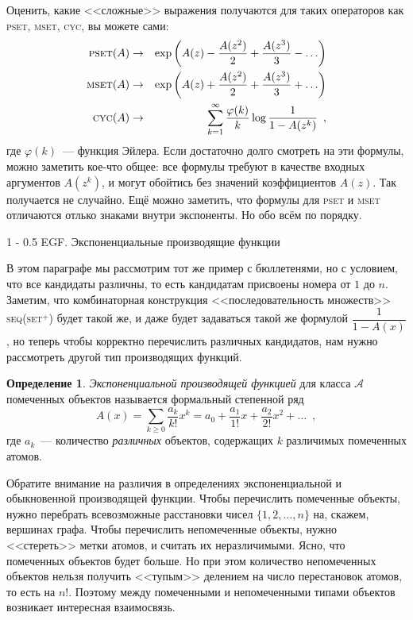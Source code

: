 \documentclass[a5paper]{article}
\makeatletter
\theoremstyle{definition}
\newtheorem*{definition}{Определение}
\renewcommand{\section}{\@startsection
{section}%
{1}%
{\z@}%
{-\baselineskip}%
{0.5\baselineskip}%
{\centering\large\scshape}} %
\makeatother
\begin{document}
Оценить, какие <<сложные>> выражения получаются для таких операторов как 
\textsc{pset}, \textsc{mset}, \textsc{cyc}, вы можете сами:
\begin{eqnarray*}
	\text{\textsc{pset}}(A) & \to & \exp \left(
		A(z) - \dfrac{A(z^2)}{2} + \dfrac{A(z^3)}{3} - \ldots
	\right)\\
	\text{\textsc{mset}}(A) & \to & \exp \left(
		A(z) + \dfrac{A(z^2)}{2} + \dfrac{A(z^3)}{3} + \ldots
	\right)\\
	\text{\textsc{cyc}}(A) & \to & 
	\sum_{k=1}^{\infty} \dfrac{\varphi(k)}{k} \log \dfrac{1}{1 - A(z^k)} 
	\enspace ,
\end{eqnarray*}
где \( \varphi(k) \)~--- функция Эйлера. Если достаточно долго смотреть на эти 
формулы, можно заметить кое-что общее: все формулы требуют в качестве входных 
аргументов \( A(z^k) \), и могут обойтись без значений коэффициентов \( A(z) 
\). Так получается не случайно. Ещё можно заметить, что формулы для 
\textsc{pset} и \textsc{mset} 
отличаются отлько знаками внутри экспоненты.
Но обо всём по порядку.

\section{EGF. Экспоненциальные производящие 
	функции}

В этом параграфе мы рассмотрим тот же пример с бюллетенями, но с условием, что 
все кандидаты 
различны, то 
есть кандидатам присвоены номера от \( 1 \) до \( n \). Заметим, что 
комбинаторная конструкция <<последовательность множеств>> 
\textsc{seq}(\textsc{set}\( ^{+} \)) будет такой же, и 
даже будет задаваться такой же формулой \( \dfrac{1}{1 - A(x)} \), но теперь 
чтобы корректно перечислить различных кандидатов, нам 
нужно рассмотреть другой тип производящих функций.

\begin{definition}
\textit{Экспоненциальной производящей функцией} для класса \( \mathcal A \) 
помеченных объектов
называется формальный 
степенной ряд
\[
	A(x) = \sum_{k \geq 0} \dfrac{a_k}{k!}x^k = a_0 + \dfrac{a_1}{1!} x + 
	\dfrac{a_2}{2!}x^2 + \ldots
	\enspace ,
\]
где \( a_k \)~--- количество \textit{различных} объектов, содержащих \( k \) 
различимых 
помеченных атомов.
\end{definition}

Обратите внимание на различия в определениях экспоненциальной и обыкновенной 
производящей функции. Чтобы перечислить помеченные объекты, нужно перебрать 
всевозможные расстановки чисел \( \{ 1, 2, \ldots, n \} \) на, скажем, вершинах 
графа. Чтобы перечислить непомеченные объекты, нужно <<стереть>> метки атомов, 
и считать их неразличимыми. Ясно, что помеченных объектов будет больше. Но при 
этом количество непомеченных объектов нельзя получить <<тупым>> делением на 
число перестановок атомов, то есть на \( n! \). Поэтому между помеченными и 
непомеченными типами объектов возникает интересная взаимосвязь.
\end{document}
